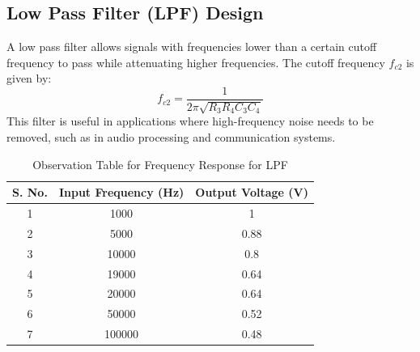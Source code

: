 \documentclass[a4paper,12pt]{article}
\begin{document}
\subsection{Low Pass Filter (LPF) Design}
A low pass filter allows signals with frequencies lower than a certain cutoff frequency to pass while attenuating higher frequencies. The cutoff frequency $f_{c2}$ is given by:
\begin{equation}
    f_{c2} = \frac{1}{2\pi \sqrt{R_3 R_4 C_3 C_4}}
\end{equation}
This filter is useful in applications where high-frequency noise needs to be removed, such as in audio processing and communication systems.
\begin{figure}[H]
    \centering
    \hfill
\end{figure}
\begin{table}[H]
    \centering
    \renewcommand{\arraystretch}{1.3} %
    \begin{tabular}{|c|c|c|}
        \hline
        \textbf{S. No.} & \textbf{Input Frequency (Hz)} &\textbf{Output Voltage (V)} \\
        \hline
        1 & 1000 & 1  \\
        2 & 5000 & 0.88  \\
        3 & 10000 & 0.8  \\
        4 & 19000 & 0.64  \\
        5 & 20000 & 0.64  \\
        6 & 50000 & 0.52  \\
        7 & 100000 & 0.48  \\
        \hline
    \end{tabular}
    \caption{Observation Table for Frequency Response for LPF}
    \label{tab:observation}
\end{table}
\end{document}
